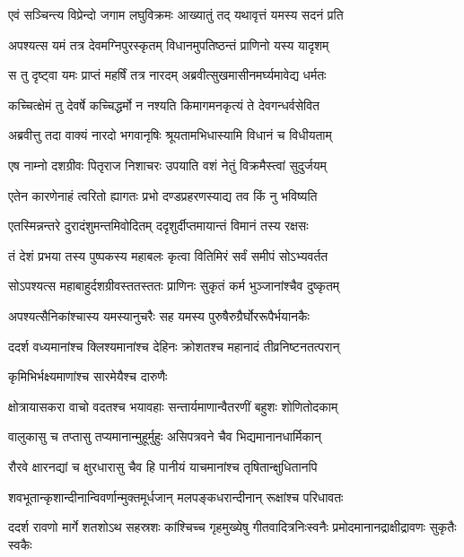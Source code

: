 
\twolineshloka
{एवं सञ्चिन्त्य विप्रेन्दो जगाम लघुविक्रमः}
{आख्यातुं तद् यथावृत्तं यमस्य सदनं प्रति} %

\twolineshloka
{अपश्यत्स यमं तत्र देवमग्निपुरस्कृतम्}
{विधानमुपतिष्ठन्तं प्राणिनो यस्य यादृशम्} %

\twolineshloka
{स तु दृष्ट्वा यमः प्राप्तं महर्षिं तत्र नारदम्}
{अब्रवीत्सुखमासीनमर्घ्यमावेद्य धर्मतः} %

\twolineshloka
{कच्चित्क्षेमं तु देवर्षे कच्चिद्धर्मो न नश्यति}
{किमागमनकृत्यं ते देवगन्धर्वसेवित} %

\twolineshloka
{अब्रवीत्तु तदा वाक्यं नारदो भगवानृषिः}
{श्रूयतामभिधास्यामि विधानं च विधीयताम्} %

\twolineshloka
{एष नाम्नो दशग्रीवः पितृराज निशाचरः}
{उपयाति वशं नेतुं विक्रमैस्त्वां सुदुर्जयम्} %

\twolineshloka
{एतेन कारणेनाहं त्वरितो ह्यागतः प्रभो}
{दण्डप्रहरणस्याद्य तव किं नु भविष्यति} %

\twolineshloka
{एतस्मिन्नन्तरे दुरादंशुमन्तमिवोदितम्}
{ददृशुर्दीप्तमायान्तं विमानं तस्य रक्षसः} %

\twolineshloka
{तं देशं प्रभया तस्य पुष्पकस्य महाबलः}
{कृत्वा वितिमिरं सर्वं समीपं सोऽभ्यवर्तत} %

\twolineshloka
{सोऽपश्यत्स महाबाहुर्दशग्रीवस्ततस्ततः}
{प्राणिनः सुकृतं कर्म भुञ्जानांश्चैव दुष्कृतम्} %

\twolineshloka
{अपश्यत्सैनिकांश्चास्य यमस्यानुचरैः सह}
{यमस्य पुरुषैरुग्रैर्घोररूपैर्भयानकैः} %

\twolineshloka
{ददर्श वध्यमानांश्च क्लिश्यमानांश्च देहिनः}
{क्रोशतश्च महानादं तीव्रनिष्टनतत्परान्} %

\onelineshloka
{कृमिभिर्भक्ष्यमाणांश्च सारमेयैश्च दारुणैः} %

\twolineshloka
{क्षोत्रायासकरा वाचो वदतश्च भयावहाः}
{सन्तार्यमाणान्वैतरणीं बहुशः शोणितोदकाम्} %

\twolineshloka
{वालुकासु च तप्तासु तप्यमानान्मुहूर्मुहुः}
{असिपत्रवने चैव भिद्यमानानधार्मिकान्} %

\twolineshloka
{रौरवे क्षारनद्यां च क्षुरधारासु चैव हि}
{पानीयं याचमानांश्च तृषितान्क्षुधितानपि} %

\twolineshloka
{शवभूतान्कृशान्दीनान्विवर्णान्मुक्तमूर्धजान्}
{मलपङ्कधरान्दीनान् रूक्षांश्च परिधावतः} %

\threelineshloka
{ददर्श रावणो मार्गे शतशोऽथ सहस्रशः}
{कांश्चिच्च गृहमुख्येषु गीतवादित्रनिःस्वनैः}
{प्रमोदमानानद्राक्षीद्रावणः सुकृतैः स्वकैः} %

